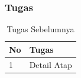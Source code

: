 \documentclass[../main.tex]{subfiles}
\begin{document}
\begin{frame}[mytitle=standard,t,mycolor=digiPH_creamy,dark]
	\frametitle{Tugas}
	\begin{table}[htb]
		\caption{Tugas Sebelumnya}
		\begin{tabularx}{\textwidth}{|p{1cm}|X|}
			\hline
			\textbf{No} & \textbf{Tugas} \\ \hline
			1           & Detail Atap    \\ \hline
		\end{tabularx}
	\end{table}
\end{frame}



\end{document}
